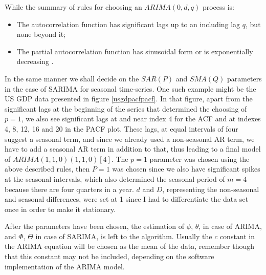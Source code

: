 \documentclass[12pt,a4paper,titlepage]{report}
\begin{document}
While the summary of rules for choosing an $ ARIMA(0, d, q) $ process is:
\begin{itemize}
    \item The autocorrelation function has significant lags up to an including lag $ q $, but none beyond it;
    \item The partial autocorrelation function has sinusoidal form or is exponentially decreasing \cite{fpp2nonseasonalarima}.
\end{itemize}

In the same manner we shall decide on the $ SAR(P) $ and $ SMA(Q) $ parameters in the case of SARIMA for seasonal time-series. One such example might be the US GDP data presented in figure \ref{usgdpacfpacf}. In that figure, apart from the significant lags at the beginning of the series that determined the choosing of $ p = 1 $, we also see significant lags at and near index 4 for the ACF and at indexes 4, 8, 12, 16 and 20 in the PACF plot. These lags, at equal intervals of four suggest a seasonal term, and since we already used a non-seasonal AR term, we have to add a seasonal AR term in addition to that, thus leading to a final model of $ ARIMA(1, 1, 0)(1, 1, 0)[4] $. The $ p = 1 $ parameter was chosen using the above described rules, then $ P = 1 $ was chosen since we also have significant spikes at the seasonal intervals, which also determined the seasonal period of $ m = 4 $ because there are four quarters in a year. $ d $ and $ D $, representing the non-seasonal and seasonal differences, were set at 1 since I had to differentiate the data set once in order to make it stationary.

After the parameters have been chosen, the estimation of $ \phi $, $ \theta $, in case of ARIMA, and $ \Phi $, $ \Theta $ in case of SARIMA, is left to the algorithm. Usually the $ c $ constant in the ARIMA equation will be chosen as the mean of the data, remember though that this constant may not be included, depending on the software implementation of the ARIMA model.
\end{document}
